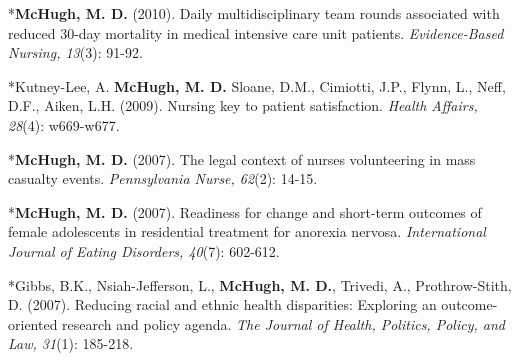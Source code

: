 \documentclass[10pt,]{article}
\begin{document}
{{{{{{{{{{{{{{{\begin{hangparas}{.25in}{1}
\end{hangparas}

\vspace{4mm}

\begin{hangparas}{.25in}{1}

*{\textbf {McHugh, M. D.}} (2010). Daily multidisciplinary team rounds associated with reduced 30-day mortality in medical intensive care unit patients. {\textit {Evidence-Based Nursing, 13}}(3): 91-92.

\end{hangparas}

\vspace{4mm}

\begin{hangparas}{.25in}{1}

*Kutney-Lee, A. {\textbf {McHugh, M. D.}} Sloane, D.M., Cimiotti, J.P., Flynn, L., Neff, D.F., Aiken, L.H. (2009). Nursing key to patient satisfaction. {\textit {Health Affairs, 28}}(4): w669-w677.

\end{hangparas}

\vspace{4mm}

\begin{hangparas}{.25in}{1}

*{\textbf {McHugh, M. D.}} (2007). The legal context of nurses volunteering in mass casualty events. {\textit {Pennsylvania Nurse, 62}}(2): 14-15.

\end{hangparas}

\vspace{4mm}

\begin{hangparas}{.25in}{1}

*{\textbf {McHugh, M. D.}} (2007). Readiness for change and short-term outcomes of female adolescents in residential treatment for anorexia nervosa. {\textit {International Journal of Eating Disorders, 40}}(7): 602-612.

\end{hangparas}

\vspace{4mm}

\begin{hangparas}{.25in}{1}

*Gibbs, B.K., Nsiah-Jefferson, L., {\textbf {McHugh, M. D.}}, Trivedi, A., Prothrow-Stith, D. (2007). Reducing racial and ethnic health disparities: Exploring an outcome-oriented research and policy agenda. {\textit {The Journal of Health, Politics, Policy, and Law, 31}}(1): 185-218.


\end{hangparas}}}}}}}}}}}}}}}}
\end{document}
